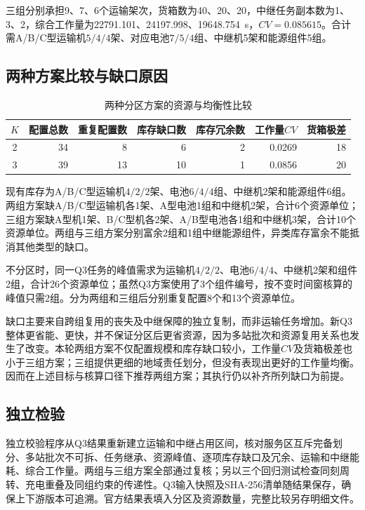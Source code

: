 三组分别承担9、7、6个运输架次，货箱数为40、20、20，中继任务副本数为1、3、2，综合工作量为22791.101、24197.998、19648.754~s，$CV=0.085615$。合计需A/B/C型运输机$5/4/4$架、对应电池$7/5/4$组、中继机5架和能源组件5组。

\subsection{两种方案比较与缺口原因}

\begin{table}[htbp]
\centering
\caption{两种分区方案的资源与均衡性比较}
\small
\begin{tabular}{crrrrrr}
\toprule
$K$ & 配置总数 & 重复配置数 & 库存缺口数 & 库存冗余数 & 工作量$CV$ & 货箱极差\\
\midrule
2 & 34 & 8 & 6 & 2 & 0.0269 & 18\\
3 & 39 & 13 & 10 & 1 & 0.0856 & 20\\
\bottomrule
\end{tabular}
\end{table}

现有库存为A/B/C型运输机$4/2/2$架、电池$6/4/4$组、中继机2架和能源组件6组。两组方案缺A/B/C型运输机各1架、A型电池1组和中继机2架，合计6个资源单位；三组方案缺A型机1架、B/C型机各2架、A/B型电池各1组和中继机3架，合计10个资源单位。两组与三组方案分别富余2组和1组中继能源组件，异类库存富余不能抵消其他类型的缺口。

不分区时，同一Q3任务的峰值需求为运输机$4/2/2$、电池$6/4/4$、中继机2架和组件2组，合计26个资源单位；虽然Q3方案使用了3个组件编号，按不变时间窗核算的峰值只需2组。分为两组和三组后分别重复配置8个和13个资源单位。

缺口主要来自跨组复用的丧失及中继保障的独立复制，而非运输任务增加。新Q3整体更省能、更快，并不保证分区后更省资源，因为多站批次和资源复用关系也发生了改变。本轮两组方案不仅配置规模和库存缺口较小，工作量$CV$及货箱极差也小于三组方案；三组提供更细的地域责任划分，但没有表现出更好的工作量均衡。因而在上述目标与核算口径下推荐两组方案；其执行仍以补齐所列缺口为前提。

\subsection{独立检验}

独立校验程序从Q3结果重新建立运输和中继占用区间，核对服务区互斥完备划分、多站批次不可拆、任务继承、资源峰值、逐项库存缺口及冗余、运输和中继能耗、综合工作量。两组与三组方案全部通过复核；另以三个回归测试检查同刻周转、充电重叠及同组约束的传递性。Q3输入快照及SHA-256清单随结果保存，确保上下游版本可追溯。官方结果表填入分区及资源数量，完整比较另存明细文件。
